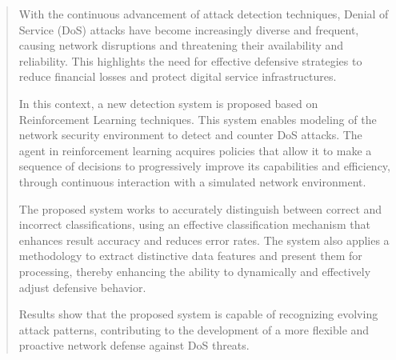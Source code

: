 \documentclass[12pt]{report}
\begin{document}
\begin{quote}
\large
With the continuous advancement of attack detection techniques, Denial of Service (DoS) attacks have become increasingly diverse and frequent, causing network disruptions and threatening their availability and reliability. This highlights the need for effective defensive strategies to reduce financial losses and protect digital service infrastructures.

In this context, a new detection system is proposed based on Reinforcement Learning techniques. This system enables modeling of the network security environment to detect and counter DoS attacks. The agent in reinforcement learning acquires policies that allow it to make a sequence of decisions to progressively improve its capabilities and efficiency, through continuous interaction with a simulated network environment.

The proposed system works to accurately distinguish between correct and incorrect classifications, using an effective classification mechanism that enhances result accuracy and reduces error rates. The system also applies a methodology to extract distinctive data features and present them for processing, thereby enhancing the ability to dynamically and effectively adjust defensive behavior.

Results show that the proposed system is capable of recognizing evolving attack patterns, contributing to the development of a more flexible and proactive network defense against DoS threats.
\end{quote}

\vspace{1em}
\end{document}
